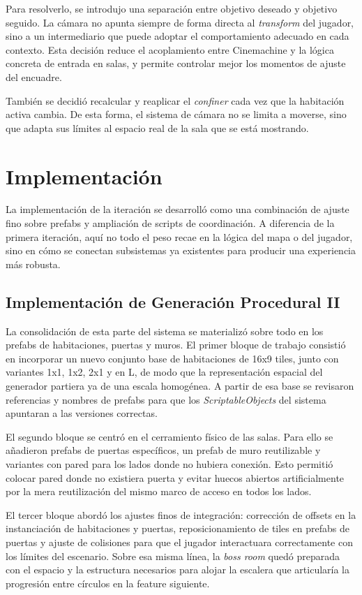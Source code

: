 Para resolverlo, se introdujo una separación entre objetivo deseado y objetivo seguido. La
cámara no apunta siempre de forma directa al \textit{transform} del jugador, sino a un
intermediario que puede adoptar el comportamiento adecuado en cada contexto. Esta decisión
reduce el acoplamiento entre Cinemachine y la lógica concreta de entrada en salas, y
permite controlar mejor los momentos de ajuste del encuadre.

También se decidió recalcular y reaplicar el \textit{confiner} cada vez que la habitación
activa cambia. De esta forma, el sistema de cámara no se limita a moverse, sino que adapta
sus límites al espacio real de la sala que se está mostrando.

\section{Implementación}
La implementación de la iteración se desarrolló como una combinación de ajuste fino sobre
prefabs y ampliación de scripts de coordinación. A diferencia de la primera iteración, aquí
no todo el peso recae en la lógica del mapa o del jugador, sino en cómo se conectan
subsistemas ya existentes para producir una experiencia más robusta.

\subsection{Implementación de Generación Procedural II}
La consolidación de esta parte del sistema se materializó sobre todo en los prefabs de
habitaciones, puertas y muros. El primer bloque de trabajo consistió en incorporar un nuevo
conjunto base de habitaciones de 16x9 tiles, junto con variantes 1x1, 1x2, 2x1 y en L, de
modo que la representación espacial del generador partiera ya de una escala homogénea. A
partir de esa base se revisaron referencias y nombres de prefabs para que los
\textit{ScriptableObjects} del sistema apuntaran a las versiones correctas.

El segundo bloque se centró en el cerramiento físico de las salas. Para ello se añadieron
prefabs de puertas específicos, un prefab de muro reutilizable y variantes con pared para
los lados donde no hubiera conexión. Esto permitió colocar pared donde no existiera puerta y
evitar huecos abiertos artificialmente por la mera reutilización del mismo marco de acceso
en todos los lados.

El tercer bloque abordó los ajustes finos de integración: corrección de offsets en la
instanciación de habitaciones y puertas, reposicionamiento de tiles en prefabs de puertas y
ajuste de colisiones para que el jugador interactuara correctamente con los límites del
escenario. Sobre esa misma línea, la \textit{boss room} quedó preparada con el espacio y la
estructura necesarios para alojar la escalera que articularía la progresión entre círculos
en la feature siguiente.

